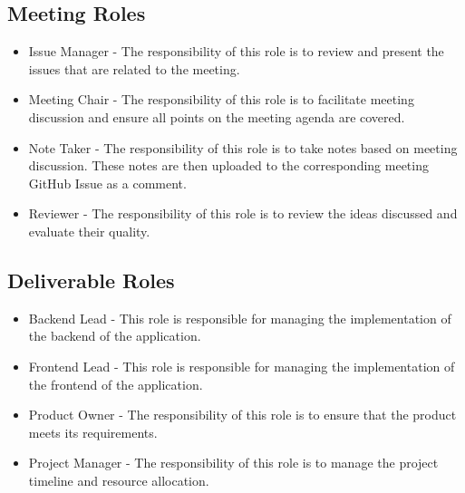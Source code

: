 \documentclass{article}
\begin{document}
\subsection*{Meeting Roles}
\begin{itemize}
  \item Issue Manager - The responsibility of this role is to review and present the issues that are related to the meeting.
  \item Meeting Chair - The responsibility of this role is to facilitate meeting discussion and ensure all points on the meeting agenda are covered.
  \item Note Taker - The responsibility of this role is to take notes based on meeting discussion. These notes are then uploaded to the corresponding meeting GitHub Issue as a comment.
  \item Reviewer - The responsibility of this role is to review the ideas discussed and evaluate their quality.
\end{itemize}

\subsection*{Deliverable Roles}
\begin{itemize}
  \item Backend Lead - This role is responsible for managing the implementation of the backend of the application.
  \item Frontend Lead - This role is responsible for managing the implementation of the frontend of the application.
  \item Product Owner - The responsibility of this role is to ensure that the product meets its requirements.
  \item Project Manager - The responsibility of this role is to manage the project timeline and resource allocation.
\end{itemize}
\end{document}
